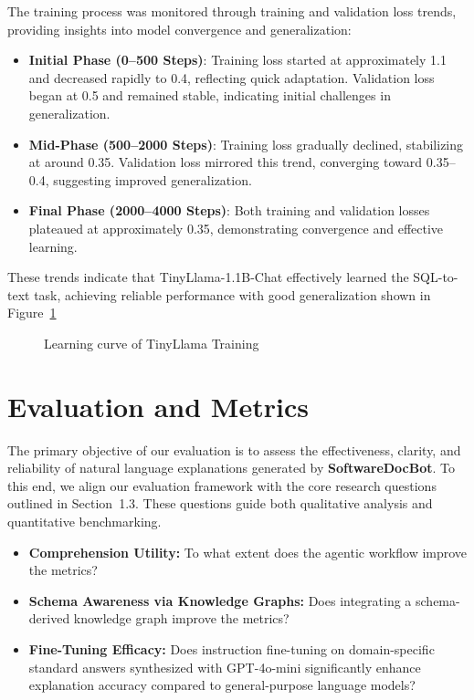 \documentclass[11pt]{article}
\begin{document}
The training process was monitored through training and validation loss trends, providing insights into model convergence and generalization:

\begin{itemize}
    \item \textbf{Initial Phase (0–500 Steps)}: Training loss started at approximately 1.1 and decreased rapidly to 0.4, reflecting quick adaptation. Validation loss began at 0.5 and remained stable, indicating initial challenges in generalization.
    \item \textbf{Mid-Phase (500–2000 Steps)}: Training loss gradually declined, stabilizing at around 0.35. Validation loss mirrored this trend, converging toward 0.35–0.4, suggesting improved generalization.
    \item \textbf{Final Phase (2000–4000 Steps)}: Both training and validation losses plateaued at approximately 0.35, demonstrating convergence and effective learning.
\end{itemize}

These trends indicate that TinyLlama-1.1B-Chat effectively learned the SQL-to-text task, achieving reliable performance with good generalization shown in Figure~\ref{fig:tiny_lc}

\begin{figure}[h]
\centering
\setlength\fboxrule{1pt}  %
\setlength\fboxsep{0pt}   %
\caption{Learning curve of TinyLlama Training }
\label{fig:tiny_lc}
\end{figure}

\section{Evaluation and Metrics}

The primary objective of our evaluation is to assess the effectiveness, clarity, and reliability of natural language explanations generated by \textbf{SoftwareDocBot}. To this end, we align our evaluation framework with the core research questions outlined in Section~1.3. These questions guide both qualitative analysis and quantitative benchmarking.

\begin{itemize}
  \item \textbf{Comprehension Utility:} To what extent does the agentic workflow improve the metrics?
  
  \item \textbf{Schema Awareness via Knowledge Graphs:} Does integrating a schema-derived knowledge graph improve the metrics?

  \item \textbf{Fine-Tuning Efficacy:} Does instruction fine-tuning on domain-specific standard answers synthesized with GPT-4o-mini significantly enhance explanation accuracy compared to general-purpose language models?
\end{itemize}
\end{document}
